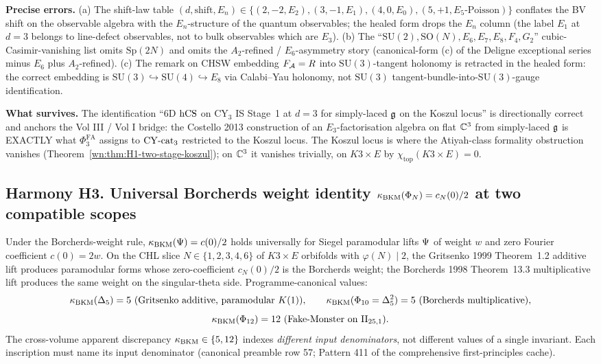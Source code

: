 \textbf{Precise errors.} (a) The shift-law table
$(d, \mathrm{shift}, E_n) \in \{(2, -2, E_2), (3, -1, E_1), (4, 0, E_0),
(5, +1, E_5\text{-Poisson})\}$ conflates the BV shift on the observable
algebra with the $E_n$-structure of the quantum observables; the
healed form drops the $E_n$ column (the label $E_1$ at $d = 3$ belongs
to line-defect observables, not to bulk observables which are $E_3$).
(b) The ``$\mathrm{SU}(2), \mathrm{SO}(N), E_6, E_7, E_8, F_4, G_2$''
cubic-Casimir-vanishing list omits $\mathrm{Sp}(2N)$ and omits the
$A_2$-refined / $E_6$-asymmetry story (canonical-form (c) of the
Deligne exceptional series minus $E_6$ plus $A_2$-refined). (c) The
remark on CHSW embedding $F_{\mathcal{A}} = R$ into $\mathrm{SU}(3)$-tangent
holonomy is retracted in the healed form: the correct embedding is
$\mathrm{SU}(3) \hookrightarrow \mathrm{SU}(4) \hookrightarrow E_8$ via
Calabi--Yau holonomy, not $\mathrm{SU}(3)$ tangent-bundle-into-$\mathrm{SU}(3)$-gauge
identification.

\textbf{What survives.} The identification ``6D $\mathrm{hCS}$ on CY$_3$ IS
Stage~1 at $d = 3$ for simply-laced $\mathfrak{g}$ on the Koszul locus'' is
directionally correct and anchors the Vol III / Vol I bridge: the
Costello 2013 construction of an $E_3$-factorisation algebra on flat
$\mathbb{C}^3$ from simply-laced $\mathfrak{g}$ is EXACTLY what $\Phi^{\mathrm{FA}}_3$
assigns to $\mathrm{CY}\text{-}\mathrm{cat}_3$ restricted to the Koszul locus. The Koszul locus
is where the Atiyah-class formality obstruction vanishes
(Theorem~\ref{wn:thm:H1-two-stage-koszul}); on $\mathbb{C}^3$ it vanishes
trivially, on $K3 \times E$ by $\chi_{\mathrm{top}}(K3 \times E) = 0$.

\subsection{Harmony H3. Universal Borcherds weight identity
$\kappa_{\mathrm{BKM}}(\Phi_N) = c_N(0)/2$ at two compatible scopes}
\label{wn:subsec:H3-universal-kBKM}

\begin{theorem}\ClaimStatusScoped
\label{wn:thm:H3-kBKM-universal}
Under the Borcherds-weight rule, $\kappa_{\mathrm{BKM}}(\Psi) = c(0)/2$ holds
universally for Siegel paramodular lifts $\Psi$ of weight $w$ and
zero Fourier coefficient $c(0) = 2w$. On the CHL slice
$N \in \{1, 2, 3, 4, 6\}$ of $K3 \times E$ orbifolds with
$\varphi(N) \mid 2$, the Gritsenko 1999 Theorem~1.2 additive lift
produces paramodular forms whose zero-coefficient $c_N(0)/2$ is the
Borcherds weight; the Borcherds 1998 Theorem~13.3 multiplicative lift
produces the same weight on the singular-theta side.
Programme-canonical values:
\[
\kappa_{\mathrm{BKM}}(\Delta_5) = 5 \text{ (Gritsenko additive, paramodular $K(1)$)},
\qquad
\kappa_{\mathrm{BKM}}(\Phi_{10} = \Delta_5^2) = 5 \text{ (Borcherds multiplicative)},
\]
\[
\kappa_{\mathrm{BKM}}(\Phi_{12}) = 12 \text{ (Fake-Monster on $\mathrm{II}_{25,1}$)}.
\]
The cross-volume apparent discrepancy $\kappa_{\mathrm{BKM}} \in \{5, 12\}$ indexes
\emph{different input denominators}, not different values of a single
invariant. Each inscription must name its input denominator (canonical
preamble row 57; Pattern 411 of the comprehensive first-principles
cache).
\end{theorem}

